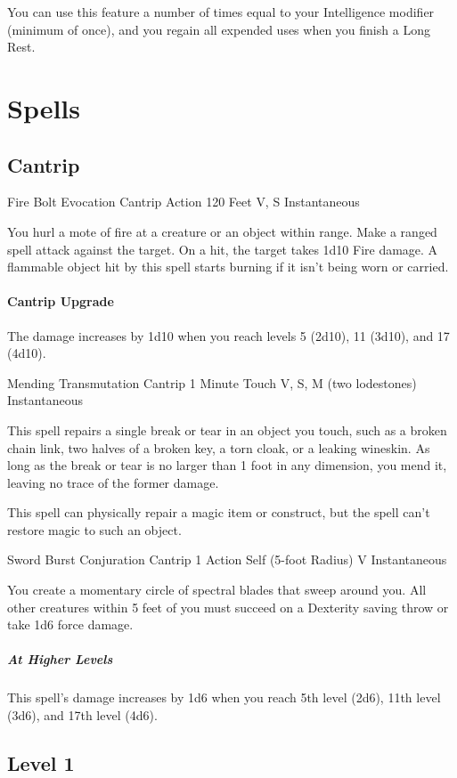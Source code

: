 \documentclass[letterpaper,openany,oneside,twocolumn]{book}
\begin{document}
You can use this feature a number of times equal to your Intelligence modifier (minimum of once), and you regain all expended uses when you finish a Long Rest.

\section*{Spells}
\subsection*{Cantrip}
\DndSpellHeader
  {Fire Bolt}
  {Evocation Cantrip}
  {Action}
  {120 Feet}
  {V, S}
  {Instantaneous}

You hurl a mote of fire at a creature or an object within range. Make a ranged spell attack against the target. On a hit, the target takes 1d10 Fire damage. A flammable object hit by this spell starts burning if it isn't being worn or carried.

\paragraph*{Cantrip Upgrade} The damage increases by 1d10 when you reach levels 5 (2d10), 11 (3d10), and 17 (4d10).

\DndSpellHeader
  {Mending}
  {Transmutation Cantrip}
  {1 Minute}
  {Touch}
  {V, S, M (two lodestones)}
  {Instantaneous}

This spell repairs a single break or tear in an object you touch, such as a broken chain link, two halves of a broken key, a torn cloak, or a leaking wineskin. As long as the break or tear is no larger than 1 foot in any dimension, you mend it, leaving no trace of the former damage.

This spell can physically repair a magic item or construct, but the spell can't restore magic to such an object.

\DndSpellHeader
  {Sword Burst}
  {Conjuration Cantrip}
  {1 Action}
  {Self (5-foot Radius)}
  {V}
  {Instantaneous}

You create a momentary circle of spectral blades that sweep around you. All other creatures within 5 feet of you must succeed on a Dexterity saving throw or take 1d6 force damage.

\subparagraph*{At Higher Levels} This spell's damage increases by 1d6 when you reach 5th level (2d6), 11th level (3d6), and 17th level (4d6).

\subsection*{Level 1}
\end{document}
